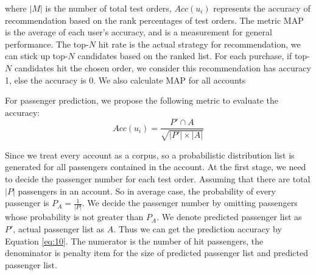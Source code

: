 \documentclass{llncs}
\begin{document}
where $|M|$ is the number of total test orders, $Acc(u_i)$ represents the accuracy of recommendation based on the rank percentages of test orders. The metric MAP is the average of each user's accuracy, and is a measurement for general performance. The top-$N$ hit rate is the actual strategy for recommendation, we can stick up top-$N$ candidates based on the ranked list. For each purchase, if top-$N$ candidates hit the chosen order, we consider this recommendation has accuracy 1, else the accuracy is 0. We also calculate MAP for all accounts \par
For passenger prediction, we propose the following metric to evaluate the accuracy:\\
\begin{equation}
\label{eq:10}
Acc(u_i) = \frac{P' \cap A}{\sqrt{|P'| \times |A|}}
\end{equation}\par
Since we treat every account as a corpus, so a probabilistic distribution list is generated for all passengers contained in the account. At the first stage, we need to decide the passenger number for each test order. Assuming that there are total $|P|$ passengers in an account. So in average case, the probability of every passenger is $P_A = \frac{1}{|P|}$. We decide the passenger number by omitting passengers whose probability is not greater than $P_A$. We denote predicted passenger list as $P'$, actual passenger list as $A$. Thus we can get the prediction accuracy by Equation \ref{eq:10}. The numerator is the number of hit passengers, the denominator is penalty item for the size of predicted passenger list and predicted passenger list.
\end{document}

